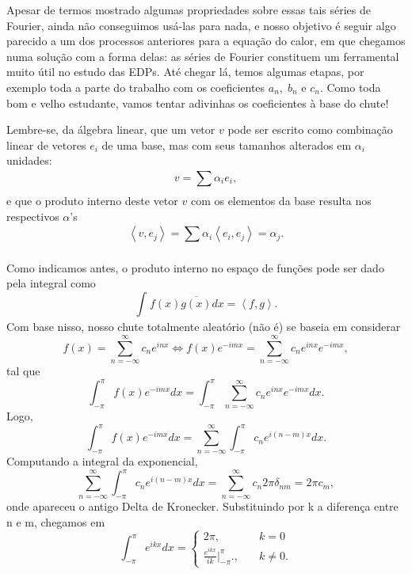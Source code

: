 \documentclass[../pde_notes.tex]{subfiles}
\begin{document}
Apesar de termos mostrado algumas propriedades sobre essas tais séries de Fourier, ainda não conseguimos usá-las para nada, e nosso objetivo é seguir algo parecido a um dos processos anteriores para a equação do calor, em que chegamos numa solução com a forma delas: as séries de Fourier constituem um ferramental muito útil no estudo das EDPs. Até chegar lá, temos algumas etapas, por exemplo toda a parte do trabalho com os coeficientes \(a_{n},\; b_{n}\) e \(c_{n}\).
Como toda bom e velho estudante, vamos tentar adivinhas os coeficientes à base do chute!
\begin{tcolorbox}[
		skin=enhanced,
		title=Lembrete!,
		after title={\hfill Combinação Linear e Produto Interno},
		fonttitle=\bfseries,
		sharp corners=downhill,
		colframe=black,
		colbacktitle=yellow!75!white,
		colback=yellow!30,
		colbacklower=black,
		coltitle=black,
		drop large lifted shadow
	]
	Lembre-se, da álgebra linear, que um vetor \(v\) pode ser escrito como combinação linear de vetores \(e_{i}\) de uma base, mas com seus tamanhos alterados em \(\alpha_{i}\) unidades:
	\[
		v=\sum\limits_{}^{}\alpha_{i}e_{i},
	\]
	e que o produto interno deste vetor \(v\) com os elementos da base resulta nos respectivos \(\alpha\)'s
	\[
		\left< v, e_{j} \right> = \sum\limits_{}^{}\alpha_{i} \left< e_{i}, e_{j} \right> = \alpha_{j}.
	\]

\end{tcolorbox}
Como indicamos antes, o produto interno no espaço de funções pode ser dado pela integral como
\[
	\int_{}^{}f(x)\overline{g(x)}dx = \left< f, g \right>.
\]
Com base nisso, nosso chute totalmente aleatório (não é) se baseia em considerar
\[
	f(x) = \sum\limits_{n=-\infty}^{\infty}c_{n}e^{inx} \Longleftrightarrow f(x)e^{-imx} = \sum\limits_{n=-\infty}^{\infty}c_{n}e^{inx}e^{-imx},
\]
tal que
\[
	\int_{-\pi }^{\pi }f(x)e^{-imx}dx = \int_{-\pi }^{\pi }\sum\limits_{n=-\infty}^{\infty}c_{n}e^{inx}e^{-imx}dx.
\]
Logo,
\[
	\int_{-\pi }^{\pi }f(x)e^{-imx}dx = \sum\limits_{n=-\infty}^{\infty}\int_{-\pi }^{\pi }c_{n}e^{i(n-m)x}dx.
\]
Computando a integral da exponencial,
\[
	\sum\limits_{n=-\infty}^{\infty}\int_{-\pi }^{\pi }c_{n}e^{i(n-m)x}dx = \sum\limits_{n=-\infty}^{\infty}c_{n}2\pi \delta_{nm}=2\pi c_{m},
\]
onde apareceu o antigo Delta de Kronecker. Substituindo por k a diferença entre n e m, chegamos em
\[
	\int_{-\pi }^{\pi }e^{ikx}dx  = \left\{\begin{array}{ll}
		2\pi ,                                           & \quad k = 0   \\
		\frac{e^{ikx}}{ik}\biggl|_{-\pi }^{\pi }\biggr., & \quad k\neq0.
	\end{array}\right.
\]
\end{document}
